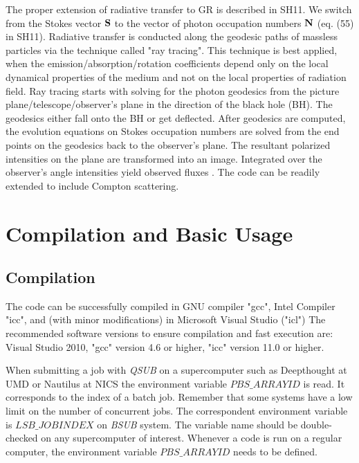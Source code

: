 \documentclass{emulateapj}
\begin{document}
The proper extension of radiative transfer to GR is described in SH11. We switch from the Stokes vector ${\bf S}$ to the vector of photon occupation numbers ${\bf N}$ (eq. (55) in SH11).
Radiative transfer is conducted along the geodesic paths of massless particles via the technique called "ray tracing". This technique is best applied,
when the emission/absorption/rotation coefficients depend only on the local dynamical properties of the medium and not on the local properties of radiation field.
Ray tracing starts with solving for the photon geodesics from the picture plane/telescope/observer's plane in the direction of the black hole (BH).
The geodesics either fall onto the BH or get deflected. After geodesics are computed, the evolution equations on Stokes occupation numbers are solved from the end points
on the geodesics back to the observer's plane. The resultant polarized intensities on the plane are transformed into an image.
Integrated over the observer's angle intensities yield observed fluxes \citep{Rybicki1979}. The code can be readily extended to include Compton scattering.


\section{Compilation and Basic Usage}
\subsection{Compilation}
The code can be successfully compiled in GNU compiler "gcc", Intel Compiler "icc", and (with minor modifications) in Microsoft Visual Studio ("icl")
The recommended software versions to ensure compilation and fast execution are: Visual Studio 2010, "gcc" version 4.6 or higher, "icc" version 11.0 or higher.

When submitting a job with \textit{QSUB} on a supercomputer such as Deepthought at UMD or Nautilus at NICS
the environment variable $PBS\_ARRAYID$ is read. It corresponds to the index of a batch job.
Remember that some systems have a low limit on the number of concurrent jobs.
The correspondent environment variable is $LSB\_JOBINDEX$ on \textit{BSUB} system. The variable name should be double-checked on any supercomputer of interest.
Whenever a code is run on a regular computer, the environment variable $PBS\_ARRAYID$ needs to be defined.
\end{document}
